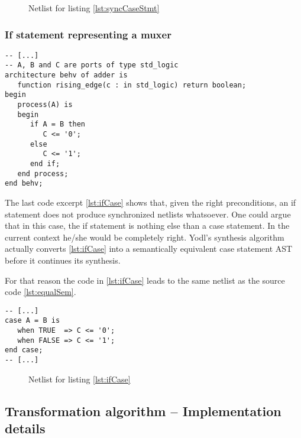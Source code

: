 \begin{figure}[p]
    \centering
    \caption{Netlist for listing \ref{lst:syncCaseStmt}}
    
    \label{fig:netlistSyncCaseStmt}
\end{figure}

\subsubsection{If statement representing a muxer}
\leavevmode\begin{lstlisting}[style=vhdl, caption={Code for an if statement
      actually representing a case statement (aka. muxer)},
    label={lst:ifCase}]
-- [...]
-- A, B and C are ports of type std_logic
architecture behv of adder is
   function rising_edge(c : in std_logic) return boolean;
begin
   process(A) is
   begin
      if A = B then
         C <= '0';
      else
         C <= '1';
      end if;
   end process;
end behv;
\end{lstlisting}
%
The last code excerpt \ref{lst:ifCase} shows that, given the right
preconditions, an if statement does not produce synchronized
netlists whatsoever. One could argue that in this case, the if
statement is nothing else than a case statement. In the current context
he/she would be completely right. Yodl's synthesis algorithm actually
converts \ref{lst:ifCase} into a semantically equivalent case
statement AST before it continues its synthesis. %

For that reason the code in \ref{lst:ifCase} leads to the same netlist
as the source code \ref{lst:equalSem}.
\begin{lstlisting}[style=vhdl, caption={Equal semantics as in
      \ref{lst:ifCase}}, label={lst:equalSem}]
-- [...]
case A = B is
   when TRUE  => C <= '0';
   when FALSE => C <= '1';
end case;
-- [...]
\end{lstlisting}

\begin{figure}
    \centering
    \caption{Netlist for listing \ref{lst:ifCase}}
    
    \label{fig:netlistIfCase}
\end{figure}

\subsection{Transformation algorithm -- Implementation details}

